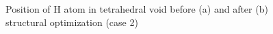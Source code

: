 \begin{figure}[h!]
\begin{minipage}[h]{0.49\linewidth}
\end{minipage}
\hfill
\begin{minipage}[h]{0.49\linewidth}
\end{minipage}
\caption{Position of H atom in tetrahedral void before (a) and after (b) structural optimization (case 2)}
\label{ris:tet2}
\end{figure}


